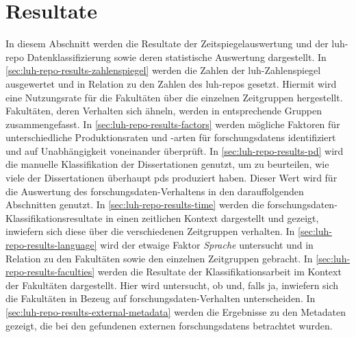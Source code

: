 \section{Resultate}\label{sec:luh-repo-results}
In diesem Abschnitt werden die Resultate der Zeitspiegelauswertung und der \gls{luh-repo} Datenklassifizierung sowie deren statistische Auswertung dargestellt.
In \cref{sec:luh-repo-results-zahlenspiegel} werden die Zahlen der \gls{luh}-Zahlenspiegel ausgewertet und in Relation zu den Zahlen des \gls{luh-repo}s gesetzt.
Hiermit wird eine Nutzungsrate für die Fakultäten über die einzelnen Zeitgruppen hergestellt.
Fakultäten, deren Verhalten sich ähneln, werden in entsprechende Gruppen zusammengefasst.
In \cref{sec:luh-repo-results-factors} werden mögliche Faktoren für unterschiedliche Produktionsraten und -arten für \glspl{forschungsdaten} identifiziert und auf Unabhängigkeit voneinander überprüft.
In \cref{sec:luh-repo-results-pd} wird die manuelle Klassifikation der Dissertationen genutzt, um zu beurteilen, wie viele der Dissertationen überhaupt \glspl{pd} produziert haben.
Dieser Wert wird für die Auswertung des \gls{forschungsdaten}-Verhaltens in den darauffolgenden Abschnitten genutzt.
In \cref{sec:luh-repo-results-time} werden die \gls{forschungsdaten}-Klassifikationsresultate in einen zeitlichen Kontext dargestellt und gezeigt, inwiefern sich diese über die verschiedenen Zeitgruppen verhalten.
In \cref{sec:luh-repo-results-language} wird der etwaige Faktor \textit{Sprache} untersucht und in Relation zu den Fakultäten sowie den einzelnen Zeitgruppen gebracht.
In \cref{sec:luh-repo-results-faculties} werden die Resultate der Klassifikationsarbeit im Kontext der Fakultäten dargestellt.
Hier wird untersucht, ob und, falls ja, inwiefern sich  die Fakultäten in Bezeug auf \gls{forschungsdaten}-Verhalten unterscheiden.
In \cref{sec:luh-repo-results-external-metadata} werden die Ergebnisse zu den Metadaten gezeigt, die bei den gefundenen externen \glspl{forschungsdaten} betrachtet wurden.

